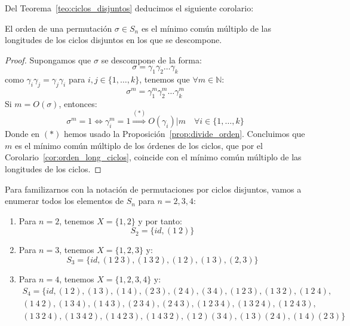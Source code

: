 Del Teorema~\ref{teo:ciclos_disjuntos} deducimos el siguiente corolario:
\begin{coro}\label{cor:orden_permutacion}
    El orden de una permutación $\sigma\in S_n$ es el mínimo común múltiplo de las longitudes de los ciclos disjuntos en los que se descompone.
    \begin{proof}
        Supongamos que $\sigma$ se descompone de la forma:
        \begin{equation*}
            \sigma = \gamma_1\gamma_2\ldots \gamma_k
        \end{equation*}
        como $\gamma_i \gamma_j = \gamma_j \gamma_i$ para $i,j\in \{1,\ldots,k\}$, tenemos que $\forall m\in \mathbb{N}$:
        \begin{equation*}
            \sigma^m = \gamma_1^m \gamma_2^m \ldots \gamma_k^m
        \end{equation*}
        Si $m = O(\sigma)$, entonces:
        \begin{equation*}
            \sigma^m = 1 \Longleftrightarrow \gamma_i^m = 1 \stackrel{(\ast)}{\Longrightarrow} O(\gamma_i) | m \quad \forall i \in \{1,\ldots,k\}
        \end{equation*}
        Donde en $(\ast)$ hemos usado la Proposición~\ref{prop:divide_orden}. Concluimos que $m$ es el mínimo común múltiplo de los órdenes de los ciclos, que por el Corolario~\ref{cor:orden_long_ciclos}, coincide con el mínimo común múltiplo de las longitudes de los ciclos.
    \end{proof}
\end{coro}

\begin{ejemplo}
    Para familizarnos con la notación de permutaciones por ciclos disjuntos, vamos a enumerar todos los elementos de $S_n$ para $n=2,3,4$:
    \begin{enumerate}
        \item Para $n=2$, tenemos $X=\{1,2\}$ y por tanto:
            \begin{equation*}
                S_2 = \{id, (1\ 2)\}
            \end{equation*}
        \item Para $n=3$, tenemos $X=\{1,2,3\}$ y:
            \begin{equation*}
                S_3 = \{id, (1\ 2\ 3), (1\ 3\ 2), (1\ 2), (1\ 3), (2, 3)\}
            \end{equation*}
        \item Para $n=4$, tenemos $X=\{1,2,3,4\}$ y:
            \begin{multline*}
                S_4 = \{id, (1\ 2), (1\ 3), (1\ 4), (2\ 3), (2\ 4), (3\ 4), (1\ 2\ 3), (1\ 3\ 2), (1\ 2\ 4), \\
                    (1\ 4\ 2), (1\ 3\ 4), (1\ 4\ 3), (2\ 3\ 4), (2\ 4\ 3), (1\ 2\ 3\ 4), (1\ 3\ 2\ 4), (1\ 2\ 4\ 3), \\
                (1\ 3\ 2\ 4), (1\ 3\ 4\ 2), (1\ 4\ 2\ 3), (1\ 4\ 3\ 2), (1\ 2)(3\ 4), (1\ 3)(2\ 4), (1\ 4)(2\ 3)\}
            \end{multline*}
    \end{enumerate}
\end{ejemplo}


